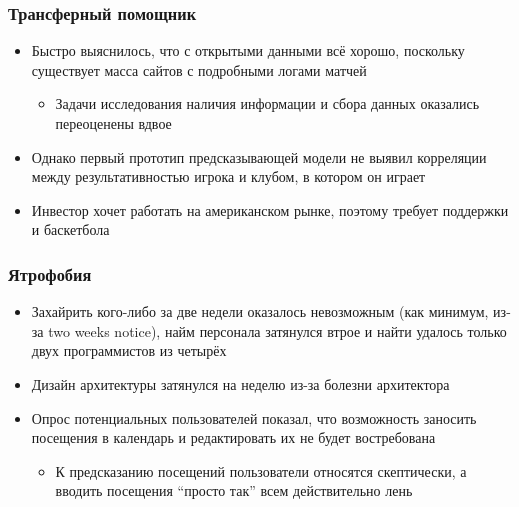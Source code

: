 \documentclass[xetex,mathserif,serif]{beamer}
\begin{document}
	\begin{frame}
		\frametitle{Трансферный помощник}
		\begin{itemize}
			\item Быстро выяснилось, что с открытыми данными всё хорошо, поскольку существует масса сайтов с подробными логами матчей
			\begin{itemize}
				\item Задачи исследования наличия информации и сбора данных оказались переоценены вдвое
			\end{itemize}
			\item Однако первый прототип предсказывающей модели не выявил корреляции между результативностью игрока и клубом, в котором он играет
			\item Инвестор хочет работать на американском рынке, поэтому требует поддержки и баскетбола
		\end{itemize}
	\end{frame}

	\begin{frame}
		\frametitle{Ятрофобия}
		\begin{itemize}
			\item Захайрить кого-либо за две недели оказалось невозможным (как минимум, из-за two weeks notice), найм персонала затянулся втрое и найти удалось только двух программистов из четырёх
			\item Дизайн архитектуры затянулся на неделю из-за болезни архитектора
			\item Опрос потенциальных пользователей показал, что возможность заносить посещения в календарь и редактировать их не будет востребована
			\begin{itemize}
				\item К предсказанию посещений пользователи относятся скептически, а вводить посещения ``просто так'' всем действительно лень
			\end{itemize}
		\end{itemize}
	\end{frame}
\end{document}
